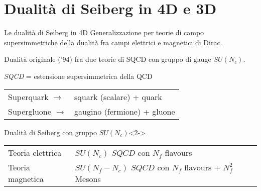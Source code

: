 \documentclass[10pt,compress]{beamer}
\begin{document}
\section{Dualità di Seiberg in 4D e 3D}
\begin{frame}{Le dualità di Seiberg in 4D}
Generalizzazione per teorie di campo supersimmetriche della dualità fra campi elettrici e magnetici di Dirac.\\
\vspace{0.5cm}

Dualità originale ('94) fra due teorie di SQCD con gruppo di gauge $SU(N_c)$.\\
\vspace{0.5cm}

{ \centering \emph{SQCD} = estensione supersimmetrica della QCD \\
}\begin{table}
\begin{tabular}{l l}
Superquark \quad $\longrightarrow$& squark (scalare) + quark \\
Supergluone \quad $\longrightarrow$& gaugino (fermione) + gluone \\
\end{tabular}
\end{table}

\begin{block}{Dualità di Seiberg con gruppo $SU(N_c)$}<2->

\begin{table}
\begin{tabular}{l l}
Teoria elettrica  & $SU(N_c)$  $SQCD$ con $N_f$  flavours \\[0.2cm]
Teoria magnetica & $SU(N_f - N_c)$  $SQCD$ con $N_f$ flavours  + $N_f^2$  Mesons\\
\end{tabular}
\end{table}
\end{block}
\end{frame}
\end{document}
